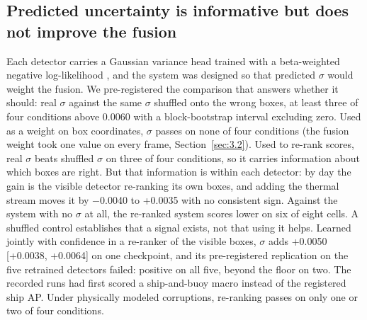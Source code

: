 \documentclass[journal]{IEEEtran}
\begin{document}
\subsection{Predicted uncertainty is informative but does not improve the fusion}\label{sec:6.1}
Each detector carries a Gaussian variance head \cite{choi2019gaussian} trained with a beta-weighted negative log-likelihood \cite{seitzer2022on}, and the system was designed so that predicted $\sigma$ would weight the fusion. We pre-registered the comparison that answers whether it should: real $\sigma$ against the same $\sigma$ shuffled onto the wrong boxes, at least three of four conditions above 0.0060 with a block-bootstrap interval excluding zero. Used as a weight on box coordinates, $\sigma$ passes on none of four conditions (the fusion weight took one value on every frame, Section~\ref{sec:3.2}). Used to re-rank scores, real $\sigma$ beats shuffled $\sigma$ on three of four conditions, so it carries information about which boxes are right. But that information is within each detector: by day the gain is the visible detector re-ranking its own boxes, and adding the thermal stream moves it by $-$0.0040 to +0.0035 with no consistent sign. Against the system with no $\sigma$ at all, the re-ranked system scores lower on six of eight cells. A shuffled control establishes that a signal exists, not that using it helps. Learned jointly with confidence in a re-ranker of the visible boxes, $\sigma$ adds +0.0050 [+0.0038, +0.0064] on one checkpoint, and its pre-registered replication on the five retrained detectors failed: positive on all five, beyond the floor on two. The recorded runs had first scored a ship-and-buoy macro instead of the registered ship AP. Under physically modeled corruptions, re-ranking passes on only one or two of four conditions.
\end{document}
